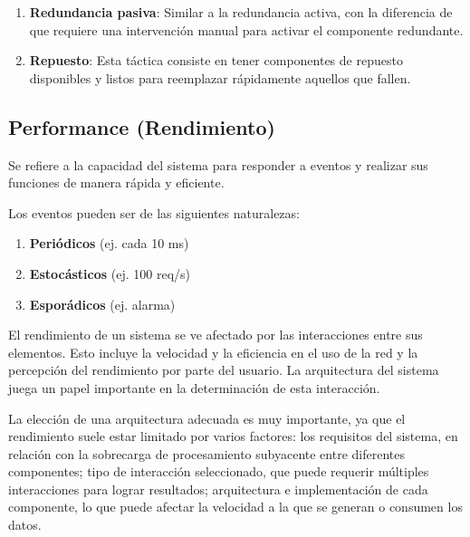\documentclass{article}
\begin{document}
\begin{itemize}
\begin{enumerate}
					\item \textbf{Redundancia pasiva}: Similar a la redundancia activa, con la diferencia de que requiere una intervención manual para activar el componente redundante.
					
					\item \textbf{Repuesto}: Esta táctica consiste en tener componentes de repuesto disponibles y listos para reemplazar rápidamente aquellos que fallen.
					
					
				\end{enumerate}
				
				
			\end{itemize}
				
		
		
		
		
		\subsection{Performance \small{(Rendimiento)}}
		 Se refiere a la capacidad del sistema para responder a eventos y realizar sus funciones de manera rápida y eficiente.
		 
		 Los eventos pueden ser de las siguientes naturalezas: 
		 \begin{enumerate}
		 	\item \textbf{Periódicos} (ej. cada 10 ms)
		 	
		 	\item \textbf{Estocásticos}  (ej. 100 req/s)
		 	
		 	\item \textbf{Esporádicos}  (ej. alarma)
		 \end{enumerate}
		 
		 El rendimiento de un sistema se ve afectado por las interacciones entre sus elementos. Esto incluye la velocidad y la eficiencia en el uso de la red y la percepción del rendimiento por parte del usuario. La arquitectura del sistema juega un papel importante en la determinación de esta interacción.
		 
		 La elección de una arquitectura adecuada es muy importante, ya que el rendimiento suele estar limitado por varios factores: los requisitos del sistema, en relación con la sobrecarga de procesamiento subyacente entre diferentes componentes; tipo de interacción seleccionado, que puede requerir múltiples interacciones para lograr resultados; arquitectura e implementación de cada componente, lo que puede afectar la velocidad a la que se generan o consumen los datos.
		 
\end{document}
